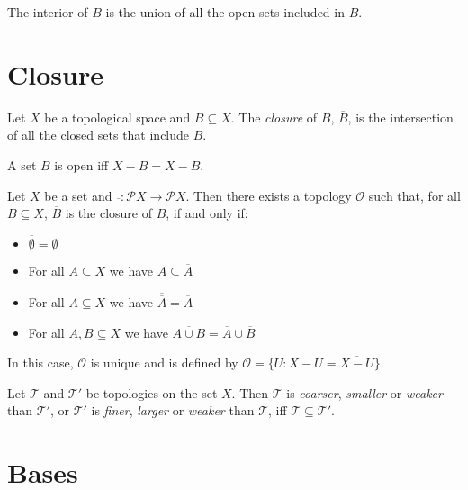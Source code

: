 \begin{df}[Interior]
The interior of $B$ is the union of all the open sets included in $B$.
\end{df}

\section{Closure}

\begin{df}[Closure]
Let $X$ be a topological space and $B \subseteq X$. The \emph{closure} of $B$, $\overline{B}$, is the intersection of all the closed sets that include $B$.
\end{df}

\begin{prop}
A set $B$ is open iff $X - B = \overline{X - B}$.
\end{prop}

\begin{prop}
Let $X$ be a set and $\overline{\ } : \mathcal{P} X \rightarrow \mathcal{P} X$. Then there exists a topology $\mathcal{O}$ such that, for all $B \subseteq X$, $\overline{B}$ is the closure of $B$, if and only if:
\begin{itemize}
\item $\overline{\emptyset} = \emptyset$
\item For all $A \subseteq X$ we have $A \subseteq \overline{A}$
\item For all $A \subseteq X$ we have $\overline{\overline{A}} = \overline{A}$
\item For all $A, B \subseteq X$ we have $\overline{A \cup B} = \overline{A} \cup \overline{B}$
\end{itemize}
In this case, $\mathcal{O}$ is unique and is defined by $\mathcal{O} = \{ U : X - U = \overline{X - U} \}$.
\end{prop}

\begin{df}
Let $\mathcal{T}$ and $\mathcal{T}'$ be topologies on the set $X$. Then $\mathcal{T}$ is \emph{coarser}, \emph{smaller} or \emph{weaker} than $\mathcal{T}'$, or $\mathcal{T}'$ is \emph{finer}, \emph{larger} or \emph{weaker} than $\mathcal{T}$, iff $\mathcal{T} \subseteq \mathcal{T}'$.
\end{df}

\section{Bases}

